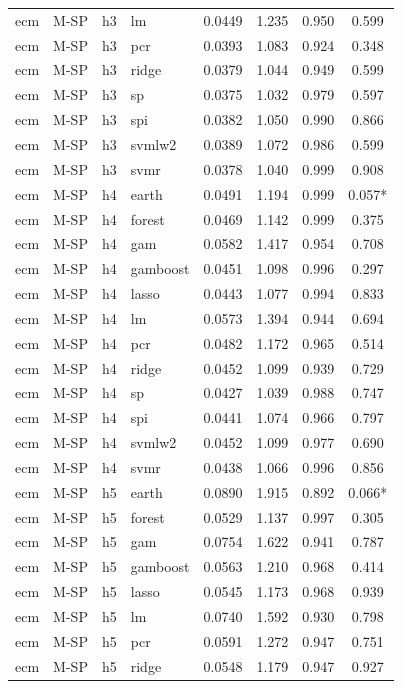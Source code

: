 \begin{ThreePartTable}
\begin{longtable}[t]{llclcccc}
ecm & M-SP & h3 & lm & 0.0449 & 1.235 & 0.950 & 0.599\\
ecm & M-SP & h3 & pcr & 0.0393 & 1.083 & 0.924 & 0.348\\
ecm & M-SP & h3 & ridge & 0.0379 & 1.044 & 0.949 & 0.599\\
ecm & M-SP & h3 & sp & 0.0375 & 1.032 & 0.979 & 0.597\\
ecm & M-SP & h3 & spi & 0.0382 & 1.050 & 0.990 & 0.866\\
ecm & M-SP & h3 & svmlw2 & 0.0389 & 1.072 & 0.986 & 0.599\\
ecm & M-SP & h3 & svmr & 0.0378 & 1.040 & 0.999 & 0.908\\
\addlinespace
ecm & M-SP & h4 & earth & 0.0491 & 1.194 & 0.999 & 0.057*\\
ecm & M-SP & h4 & forest & 0.0469 & 1.142 & 0.999 & 0.375\\
ecm & M-SP & h4 & gam & 0.0582 & 1.417 & 0.954 & 0.708\\
ecm & M-SP & h4 & gamboost & 0.0451 & 1.098 & 0.996 & 0.297\\
ecm & M-SP & h4 & lasso & 0.0443 & 1.077 & 0.994 & 0.833\\
ecm & M-SP & h4 & lm & 0.0573 & 1.394 & 0.944 & 0.694\\
ecm & M-SP & h4 & pcr & 0.0482 & 1.172 & 0.965 & 0.514\\
ecm & M-SP & h4 & ridge & 0.0452 & 1.099 & 0.939 & 0.729\\
ecm & M-SP & h4 & sp & 0.0427 & 1.039 & 0.988 & 0.747\\
ecm & M-SP & h4 & spi & 0.0441 & 1.074 & 0.966 & 0.797\\
ecm & M-SP & h4 & svmlw2 & 0.0452 & 1.099 & 0.977 & 0.690\\
ecm & M-SP & h4 & svmr & 0.0438 & 1.066 & 0.996 & 0.856\\
\addlinespace
ecm & M-SP & h5 & earth & 0.0890 & 1.915 & 0.892 & 0.066*\\
ecm & M-SP & h5 & forest & 0.0529 & 1.137 & 0.997 & 0.305\\
ecm & M-SP & h5 & gam & 0.0754 & 1.622 & 0.941 & 0.787\\
ecm & M-SP & h5 & gamboost & 0.0563 & 1.210 & 0.968 & 0.414\\
ecm & M-SP & h5 & lasso & 0.0545 & 1.173 & 0.968 & 0.939\\
ecm & M-SP & h5 & lm & 0.0740 & 1.592 & 0.930 & 0.798\\
ecm & M-SP & h5 & pcr & 0.0591 & 1.272 & 0.947 & 0.751\\
ecm & M-SP & h5 & ridge & 0.0548 & 1.179 & 0.947 & 0.927\\

\end{longtable}
\end{ThreePartTable}
